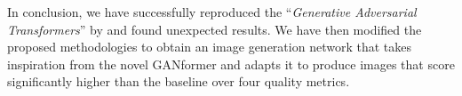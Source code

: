 \documentclass{article}
\begin{document}

In conclusion, we have successfully reproduced the ``\emph{Generative Adversarial Transformers}'' 
by \citet{hudson2021generative} and found unexpected results.
We have then modified the proposed methodologies to obtain an image generation network that 
takes inspiration from the 
novel GANformer and adapts it to produce images that score significantly higher than the baseline 
over four quality metrics.

%
%
%
%
%
%
%
\end{document}
